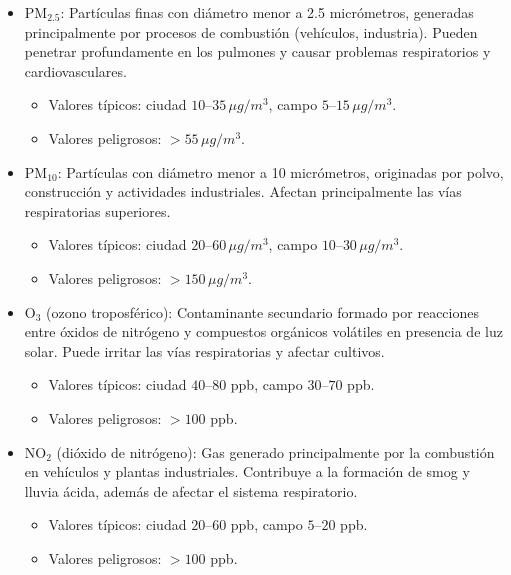 \documentclass{article}
\begin{document}
    \begin{itemize}
        \item PM$_{2.5}$: Partículas finas con diámetro menor a 2.5 micrómetros, generadas principalmente por procesos de combustión (vehículos, industria). Pueden penetrar profundamente en los pulmones y causar problemas respiratorios y cardiovasculares.
        \begin{itemize}
            \item Valores típicos: ciudad $10$--$35\,\mu g/m^3$, campo $5$--$15\,\mu g/m^3$.
            \item Valores peligrosos: $>55\,\mu g/m^3$.
        \end{itemize}
        
        \item PM$_{10}$: Partículas con diámetro menor a 10 micrómetros, originadas por polvo, construcción y actividades industriales. Afectan principalmente las vías respiratorias superiores.
        \begin{itemize}
            \item Valores típicos: ciudad $20$--$60\,\mu g/m^3$, campo $10$--$30\,\mu g/m^3$.
            \item Valores peligrosos: $>150\,\mu g/m^3$.
        \end{itemize}
        
        \item O$_3$ (ozono troposférico): Contaminante secundario formado por reacciones entre óxidos de nitrógeno y compuestos orgánicos volátiles en presencia de luz solar. Puede irritar las vías respiratorias y afectar cultivos.
        \begin{itemize}
            \item Valores típicos: ciudad $40$--$80$ ppb, campo $30$--$70$ ppb.
            \item Valores peligrosos: $>100$ ppb.
        \end{itemize}
        
        \item NO$_2$ (dióxido de nitrógeno): Gas generado principalmente por la combustión en vehículos y plantas industriales. Contribuye a la formación de smog y lluvia ácida, además de afectar el sistema respiratorio.
        \begin{itemize}
            \item Valores típicos: ciudad $20$--$60$ ppb, campo $5$--$20$ ppb.
            \item Valores peligrosos: $>100$ ppb.
        \end{itemize}
        

\end{itemize}
\end{document}
